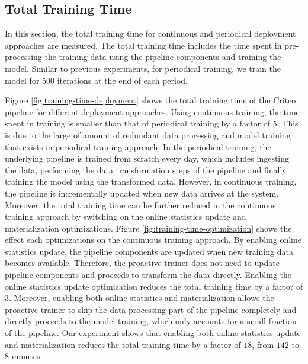 \subsection{Total Training Time}
In this section, the total training time for continuous and periodical deployment approaches are measured.
The total training time includes the time spent in pre-processing the training data using the pipeline components and training the model.
Similar to previous experiments, for periodical training, we train the model for 500 iterations at the end of each period.

Figure \ref{fig:training-time-deployment} shows the total training time of the Criteo pipeline for different deployment approaches.
Using continuous training, the time spent in training is smaller than that of periodical training by a factor of $5$.
This is due to the large of amount of redundant data processing and model training that exists in periodical training approach.
In the periodical training, the underlying pipeline is trained from scratch every day, which includes ingesting the data, performing the data transformation steps of the pipeline and finally training the model using the transformed data.
However, in continuous training, the pipeline is incrementally updated when new data arrives at the system.
Moreover, the total training time can be further reduced in the continuous training approach by switching on the online statistics update and materialization optimizations.
Figure \ref{fig:training-time-optimization} shows the effect each optimizations on the continuous training approach.
By enabling online statistics update, the pipeline components are updated when new training data becomes available.
Therefore, the proactive trainer does not need to update pipeline components and proceeds to transform the data directly.
Enabling the online statistics update optimization reduces the total training time by a factor of $3$.
Moreover, enabling both online statistics and materialization allows the proactive trainer to skip the data processing part of the pipeline completely and directly proceeds to the model training, which only accounts for a small fraction of the pipeline.
Our experiment shows that enabling both online statistics update and materialization reduces the total training time by a factor of $18$, from $142$ to $8$ minutes.

